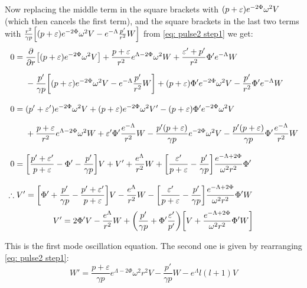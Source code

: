 \documentclass[a4paper,12pt,onehalfspacing]{report}
\begin{document}
Now replacing the middle term in the square brackets with $\qty(p+\varepsilon)e^{-2\Phi}\omega^2{V}$ (which then cancels the first term), and the square brackets in the last two terms with $\frac{r^2}{\gamma p}\qty[\qty(p+\varepsilon)e^{-2\Phi}\omega^2{V}- e^{-\Lambda}\frac{p'}{r^2}W]$ from \cref{eq: pulse2 step1} we get:
\begin{align*}
    0={}& \pdv{}{r}\qty[\qty(p+\varepsilon)e^{-2\Phi}\omega^2{V}]+\frac{p+\varepsilon}{r^2}e^{\Lambda-2\Phi}\omega^2{W}+ \frac{\varepsilon'+p'}{r^2}\Phi' e^{-\Lambda}{W}\\[1.5ex]
    {}&-\frac{p'}{\gamma p}\qty[\qty(p+\varepsilon)e^{-2\Phi}\omega^2{V}- e^{-\Lambda}\frac{p'}{r^2}W]+ \qty(p+\varepsilon)\Phi'e^{-2\Phi}\omega^2{V}- \frac{p'}{r^2}\Phi'e^{-\Lambda}W \\[2ex]
    0={}& (p'+\varepsilon')e^{-2\Phi}\omega^2{V}+ (p+\varepsilon)e^{-2\Phi}\omega^2{V'}-\qty(p+\varepsilon)\Phi' e^{-2\Phi}\omega^2{V}\\[1.5ex]
    {}&+\frac{p+\varepsilon}{r^2}e^{\Lambda-2\Phi}\omega^2{W}+{\varepsilon'}\Phi' \frac{e^{-\Lambda}}{r^2}{W} -\frac{p'\qty(p+\varepsilon)}{\gamma p}e^{-2\Phi}\omega^2{V}- \frac{p'\qty(p+\varepsilon)}{\gamma p}{\Phi'}\frac{e^{-\Lambda}}{r^2}W\\[2ex]
    0={}& \qty[\frac{p'+\varepsilon'}{p+\varepsilon} -\Phi'-\frac{p'}{\gamma p}]{V}+ {V'}+\frac{e^{\Lambda}}{r^2}{W} + \qty[\frac{\varepsilon'}{p+\varepsilon} - \frac{p'}{\gamma p}]\frac{e^{-\Lambda+2\Phi}}{\omega^2 r^2}{\Phi'}\\[2ex]
    \therefore V'&= \qty[\Phi'+\frac{p'}{\gamma p}-\frac{p'+\varepsilon'}{p+\varepsilon} ]{V}-\frac{e^{\Lambda}}{r^2}{W} - \qty[\frac{\varepsilon'}{p+\varepsilon} - \frac{p'}{\gamma p}]\frac{e^{-\Lambda+2\Phi}}{\omega^2 r^2}{\Phi'}W
\end{align*}
\begin{equation}
V'= 2\Phi'V -\frac{e^{\Lambda}}{r^2}{W}+ \qty(\frac{p'}{\gamma p}+\Phi' \frac{\varepsilon'}{p'})\qty[V+\frac{e^{-\Lambda+2\Phi}}{\omega^2 r^2}{\Phi'}W] \label{eq: dV step 1}
\end{equation}

This is the first mode oscillation equation. The second one is given by rearranging \cref{eq: pulse2 step1}:
\begin{equation}
    W'= \frac{ p+\varepsilon}{ \gamma p }e^{\Lambda-2\Phi}\omega^2 r^2 V- \frac{p'}{\gamma p}W- e^\Lambda l(l+1)V\label{eq: dW step 1}
\end{equation}
\end{document}
